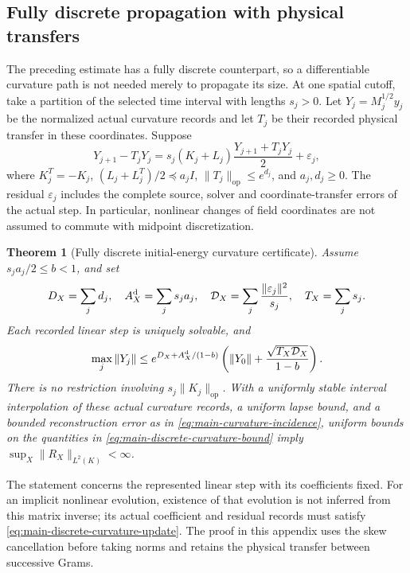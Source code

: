 \documentclass[11pt]{article}
\newtheorem{theorem}{Theorem}[section]
\numberwithin{equation}{section}
\theoremstyle{definition}
\theoremstyle{remark}
\newcommand{\op}{\mathrm{op}}
\begin{document}
\subsection{Fully discrete propagation with physical transfers}

The preceding estimate has a fully discrete counterpart, so a differentiable
curvature path is not needed merely to propagate its size.  At one spatial
cutoff, take a partition of the selected time interval with lengths $s_j>0$.
Let $Y_j=M_j^{1/2}y_j$ be the normalized actual curvature records and
let $T_j$ be their recorded physical transfer in these coordinates.  Suppose
\begin{equation}
 Y_{j+1}-T_jY_j
 =s_j(K_j+L_j)\frac{Y_{j+1}+T_jY_j}{2}+\varepsilon_j,
 \label{eq:main-discrete-curvature-update}
\end{equation}
where $K_j^T=-K_j$, $(L_j+L_j^T)/2\preceq a_jI$,
$\|T_j\|_{\op}\le e^{d_j}$, and $a_j,d_j\ge0$.  The residual
$\varepsilon_j$ includes the complete source, solver and coordinate-transfer
errors of the actual step.  In particular, nonlinear changes of field
coordinates are not assumed to commute with midpoint discretization.

\begin{theorem}[Fully discrete initial-energy curvature certificate]
\label{thm:main-discrete-curvature}
Assume $s_ja_j/2\le b<1$, and set
\begin{equation}
 D_X=\sum_jd_j,\quad A_X^{\rm d}=\sum_js_ja_j,\quad
 \mathcal D_X=\sum_j\frac{\|\varepsilon_j\|^2}{s_j},\quad
 T_X=\sum_js_j.
 \label{eq:main-discrete-curvature-budgets}
\end{equation}
Each recorded linear step is uniquely solvable, and
\begin{equation}
 \max_j\|Y_j\|
 \le e^{D_X+A_X^{\rm d}/(1-b)}
       \left(\|Y_0\|+\frac{\sqrt{T_X\mathcal D_X}}{1-b}\right).
 \label{eq:main-discrete-curvature-bound}
\end{equation}
There is no restriction involving $s_j\|K_j\|_{\op}$.  With a uniformly
stable interval interpolation of these actual curvature records, a uniform
lapse bound, and a bounded reconstruction error as in
\eqref{eq:main-curvature-incidence}, uniform bounds on the quantities in
\eqref{eq:main-discrete-curvature-bound} imply
$\sup_X\|R_X\|_{L^2(K)}<\infty$.
\end{theorem}

The statement concerns the represented linear step with its coefficients
fixed.  For an implicit nonlinear evolution, existence of that evolution is
not inferred from this matrix inverse; its actual coefficient and residual
records must satisfy \eqref{eq:main-discrete-curvature-update}.
The proof in this appendix uses the skew cancellation before
taking norms and retains the physical transfer between successive Grams.
\end{document}
